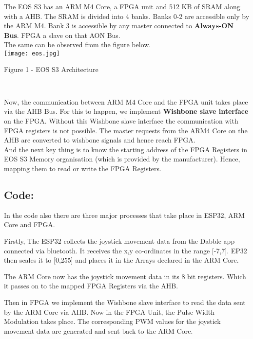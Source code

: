 \documentclass[journal,12pt,twocolumn]{IEEEtran}
\begin{document}
The EOS S3 has an ARM M4 Core, a FPGA unit and 512 KB of SRAM along with a AHB. The SRAM is divided into 4 banks. Banks 0-2 are accessible only by the ARM M4. Bank 3 is accessible by any master connected to \textbf{Always-ON Bus}. FPGA a slave on that AON Bus. \\
The same can be observed from the figure below.\\

\vspace{0.5cm}
\texttt{[image: eos.jpg]}
\centerline{Figure 1 - EOS S3 Architecture}
\

Now, the communication between ARM M4 Core and the FPGA unit takes place via the AHB Bus. For this to happen, we implement \textbf{Wishbone slave interface} on the FPGA. Without this Wishbone slave interface the communication with FPGA registers is not possible. The master requests from the ARM4 Core on the AHB are converted to wishbone signals and hence reach FPGA. \\

And the next key thing is to know the starting address of the FPGA Registers in EOS S3 Memory organisation (which is provided by the manufacturer). Hence, mapping them to read or write the FPGA Registers. 

\raggedright
\subsection{Code: }

In the code also there are three major processes that take place in ESP32, ARM Core and FPGA.\\
\vspace{0.25cm}

Firstly, The ESP32 collects the joystick movement data from the Dabble app connected via bluetooth. It receives the x,y co-ordinates in the range [-7,7]. EP32 then scales it to [0,255] and places it in the Arrays declared in the ARM Core. \\

\vspace{0.25cm}

The ARM Core now has the joystick movement data in its 8 bit registers. Which it passes on to the mapped FPGA Registers via the AHB.\\

\vspace{0.25cm}

Then in FPGA we implement the Wishbone slave interface to read the data sent by the ARM Core via AHB. Now in the FPGA Unit, the Pulse Width Modulation takes place. The corresponding PWM values for the joystick movement data are generated and sent back to the ARM Core.\\
\end{document}
